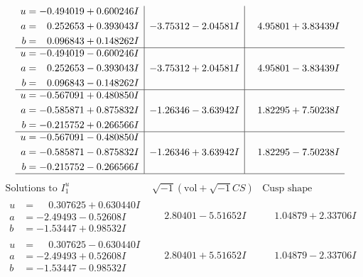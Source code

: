 \documentclass[1p]{elsarticle_modified}
\theoremstyle{definition}
\newcommand{\I}{\sqrt{-1}}
\begin{document}
$$\begin{array}{c|c|c}
\begin{aligned}
u &= -0.494019 + 0.600246 I \\
a &= \phantom{-}0.252653 + 0.393043 I \\
b &= \phantom{-}0.096843 + 0.148262 I\end{aligned}
 & -3.75312 - 2.04581 I & \phantom{-}4.95801 + 3.83439 I \\ \hline\begin{aligned}
u &= -0.494019 - 0.600246 I \\
a &= \phantom{-}0.252653 - 0.393043 I \\
b &= \phantom{-}0.096843 - 0.148262 I\end{aligned}
 & -3.75312 + 2.04581 I & \phantom{-}4.95801 - 3.83439 I \\ \hline\begin{aligned}
u &= -0.567091 + 0.480850 I \\
a &= -0.585871 + 0.875832 I \\
b &= -0.215752 + 0.266566 I\end{aligned}
 & -1.26346 - 3.63942 I & \phantom{-}1.82295 + 7.50238 I \\ \hline\begin{aligned}
u &= -0.567091 - 0.480850 I \\
a &= -0.585871 - 0.875832 I \\
b &= -0.215752 - 0.266566 I\end{aligned}
 & -1.26346 + 3.63942 I & \phantom{-}1.82295 - 7.50238 I\\
 \hline 
 \end{array}$$\newpage$$\begin{array}{c|c|c}  
\text{Solutions to }I^u_{1}& \I (\text{vol} + \sqrt{-1}CS) & \text{Cusp shape}\\
 \hline 
\begin{aligned}
u &= \phantom{-}0.307625 + 0.630440 I \\
a &= -2.49493 - 0.52608 I \\
b &= -1.53447 + 0.98532 I\end{aligned}
 & \phantom{-}2.80401 - 5.51652 I & \phantom{-}1.04879 + 2.33706 I \\ \hline\begin{aligned}
u &= \phantom{-}0.307625 - 0.630440 I \\
a &= -2.49493 + 0.52608 I \\
b &= -1.53447 - 0.98532 I\end{aligned}
 & \phantom{-}2.80401 + 5.51652 I & \phantom{-}1.04879 - 2.33706 I \\ \hline\begin{aligned}

\end{aligned}
\end{array}$$
\end{document}
